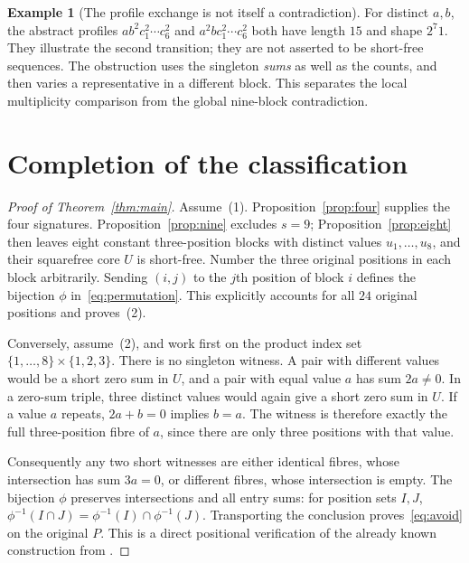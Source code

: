 \documentclass[11pt]{article}
\theoremstyle{definition}
\newtheorem{example}[theorem]{Example}
\theoremstyle{remark}
\begin{document}
\begin{example}[The profile exchange is not itself a contradiction]\label{ex:local}
For distinct $a,b$, the abstract profiles
$a b^2 c_1^2\cdots c_6^2$ and $a^2 b c_1^2\cdots c_6^2$
both have length $15$ and shape $2^7 1$. They illustrate the second
transition; they are not asserted to be short-free sequences.
The obstruction uses the singleton \emph{sums} as well as the counts,
and then varies a representative in a different block.
This separates the local multiplicity comparison from the global
nine-block contradiction.
\end{example}
\FloatBarrier

\section{Completion of the classification}\label{sec:completion}
\begin{proof}[Proof of Theorem~\ref{thm:main}]
Assume~(1). Proposition~\ref{prop:four} supplies the four signatures.
Proposition~\ref{prop:nine} excludes $s=9$; Proposition~\ref{prop:eight}
then leaves eight constant three-position blocks with distinct values
$u_1,\ldots,u_8$, and their squarefree core $U$ is short-free.
Number the three original positions in each block arbitrarily. Sending
$(i,j)$ to the $j$th position of block $i$ defines the bijection $\phi$
in~\eqref{eq:permutation}. This explicitly accounts for all $24$ original
positions and proves~(2).

Conversely, assume~(2), and work first on the product index set
$\{1,\ldots,8\}\times\{1,2,3\}$. There is no singleton witness.
A pair with different values would be a short zero sum in $U$, and a
pair with equal value $a$ has sum $2a\neq0$.
In a zero-sum triple, three distinct values would again give a short
zero sum in $U$. If a value $a$ repeats, $2a+b=0$ implies $b=a$.
The witness is therefore exactly the full three-position fibre of $a$,
since there are only three positions with that value.

Consequently any two short witnesses are either identical fibres, whose
intersection has sum $3a=0$, or different fibres, whose intersection is
empty. The bijection $\phi$ preserves intersections and all entry sums:
for position sets $I,J$,
$\phi^{-1}(I\cap J)=\phi^{-1}(I)\cap\phi^{-1}(J)$.
Transporting the conclusion proves~\eqref{eq:avoid} on the original $P$.
This is a direct positional verification of the already known
construction from \cite[proof of Lemma 3.3(2)]{Gao2024}.
\end{proof}
\end{document}
